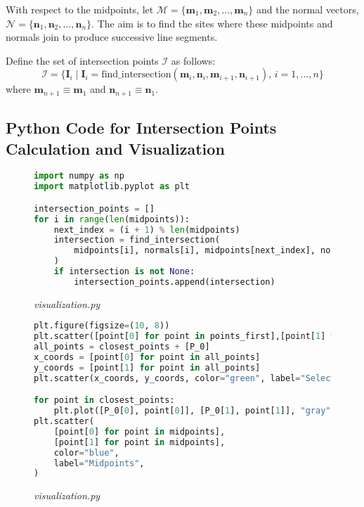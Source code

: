 \documentclass[12pt,a4paper]{report}
\begin{document}
With respect to the midpoints, let \(\mathcal{M} = \{\mathbf{m}_1, \mathbf{m}_2, \ldots, \mathbf{m}_n\}\) and the normal vectors, \(\mathcal{N} = \{\mathbf{n}_1, \mathbf{n}_2, \ldots, \mathbf{n}_n\}\). The aim is to find the sites where these midpoints and normals join to produce successive line segments.

Define the set of intersection points \(\mathcal{I}\) as follows:
\[
\mathcal{I} = \{ \mathbf{I}_i \mid \mathbf{I}_i = \text{find\_intersection}(\mathbf{m}_i, \mathbf{n}_i, \mathbf{m}_{i+1}, \mathbf{n}_{i+1}), \, i = 1, \ldots, n \}
\]
where \(\mathbf{m}_{n+1} \equiv \mathbf{m}_1\) and \(\mathbf{n}_{n+1} \equiv \mathbf{n}_1\).

\subsection{Python Code for Intersection Points Calculation and Visualization}
\begin{figure}[ht!]
\centering
\caption{\large\textit{visualization.py}}
\begin{lstlisting}[language=Python, caption={Intersection Points Calculation and Visualization}]
import numpy as np
import matplotlib.pyplot as plt

intersection_points = []
for i in range(len(midpoints)):
    next_index = (i + 1) % len(midpoints)
    intersection = find_intersection(
        midpoints[i], normals[i], midpoints[next_index], normals[next_index]
    )
    if intersection is not None:
        intersection_points.append(intersection)
\end{lstlisting}
\end{figure}
\vspace*{\fill}\newpage
\begin{figure}[ht!]
\centering
\caption{\large\textit{visualization.py}}
\begin{lstlisting}[language=Python, caption={Intersection Points Calculation and Visualization}]
plt.figure(figsize=(10, 8))
plt.scatter([point[0] for point in points_first],[point[1] for point in points_first],color="gray",label="First Generated")
all_points = closest_points + [P_0]
x_coords = [point[0] for point in all_points]
y_coords = [point[1] for point in all_points]
plt.scatter(x_coords, y_coords, color="green", label="Selected Points")

for point in closest_points:
    plt.plot([P_0[0], point[0]], [P_0[1], point[1]], "gray", linestyle="dotted")
plt.scatter(
    [point[0] for point in midpoints],
    [point[1] for point in midpoints],
    color="blue",
    label="Midpoints",
)
\end{lstlisting}
\end{figure}
\end{document}
